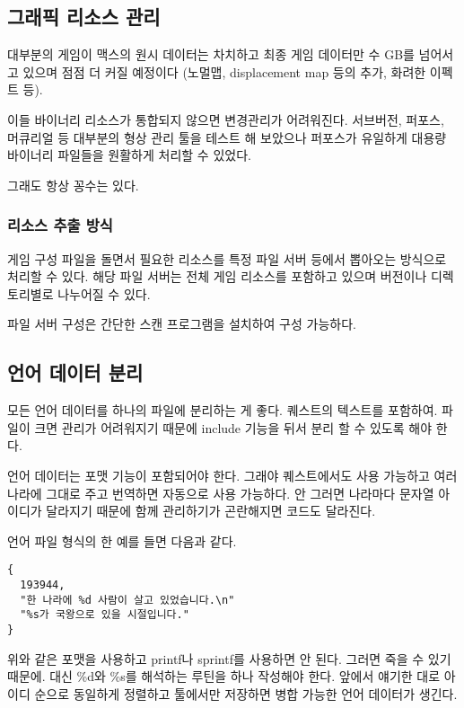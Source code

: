 \documentclass[chapter,kosection, 10.5pt, romanfixed, a4paper]{oblivoir}
\begin{document}
\subsection{그래픽 리소스 관리}

대부분의 게임이 맥스의 원시 데이터는 차치하고 최종 게임 데이터만 수 GB를 넘어서고 있으며 점점 더 
커질 예정이다 (노멀맵, displacement map 등의 추가, 화려한 이펙트 등). 

이들 바이너리 리소스가 통합되지 않으면 변경관리가 어려워진다. 서브버전, 퍼포스, 머큐리얼 등
대부분의 형상 관리 툴을 테스트 해 보았으나 퍼포스가 유일하게 대용량 바이너리 파일들을 원활하게 
처리할 수 있었다. 

그래도 항상 꽁수는 있다. 

\subsubsection{리소스 추출 방식}

게임 구성 파일을 돌면서 필요한 리소스를 특정 파일 서버 등에서 뽑아오는 방식으로 처리할 수 있다. 
해당 파일 서버는 전체 게임 리소스를 포함하고 있으며 버전이나 디렉토리별로 나누어질 수 있다. 

파일 서버 구성은 간단한 스캔 프로그램을 설치하여 구성 가능하다. 

\subsection{언어 데이터 분리}

모든 언어 데이터를 하나의 파일에 분리하는 게 좋다. 퀘스트의 텍스트를 포함하여. 
파일이 크면 관리가 어려워지기 때문에 include 기능을 뒤서 분리 할 수 있도록 해야 한다. 

언어 데이터는 포맷 기능이 포함되어야 한다. 그래야 퀘스트에서도 사용 가능하고 여러 나라에 
그대로 주고 번역하면 자동으로 사용 가능하다. 안 그러면 나라마다 문자열 아이디가 달라지기 때문에
함께 관리하기가 곤란해지면 코드도 달라진다. 

언어 파일 형식의 한 예를 들면 다음과 같다. 
\begin{verbatim}
{ 
  193944, 
  "한 나라에 %d 사람이 살고 있었습니다.\n"
  "%s가 국왕으로 있을 시절입니다."
} 
\end{verbatim}

위와 같은 포맷을 사용하고 printf나 sprintf를 사용하면 안 된다. 그러면 죽을 수 있기 때문에. 
대신 \%d와 \%s를 해석하는 루틴을 하나 작성해야 한다. 앞에서 얘기한 대로 아이디 순으로 
동일하게 정렬하고 툴에서만 저장하면 병합 가능한 언어 데이터가 생긴다. 
\end{document}
